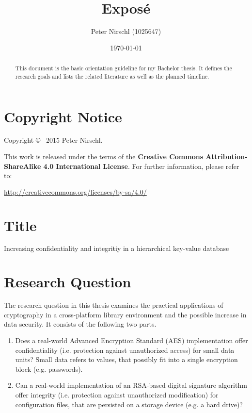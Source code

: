 \documentclass[a4paper]{article}
\title{Exposé}
\author{Peter Nirschl (1025647)}
\date{\today} %
\begin{document}
\maketitle
\begin{abstract}
This document is the basic orientation guideline for my Bachelor thesis.
It defines the research goals and lists the related literature as well as the planned timeline.
\end{abstract}
\setcounter{tocdepth}{1} %
\tableofcontents
\newpage

\section*{Copyright Notice}

Copyright \copyright~ 2015 Peter Nirschl.

This work is released under the terms of the \textbf{Creative Commons Attribution-ShareAlike 4.0 International License}.
For further information, please refer to:

\url{http://creativecommons.org/licenses/by-sa/4.0/}

\newpage

\section{Title}

Increasing confidentiality and integritiy in a hierarchical key-value database


\section{Research Question}

The research question in this thesis examines the practical applications of cryptography in a cross-platform library environment and the possible increase in data security.
It consists of the following two parts.

\begin{enumerate}
\item Does a real-world Advanced Encryption Standard (AES) implementation offer confidentiality (i.e. protection against unauthorized access) for small data units?
Small data refers to values, that possibly fit into a single encryption block (e.g. passwords).
      
\item Can a real-world implementation of an RSA-based digital signature algorithm offer integrity (i.e. protection against unauthorized modification) for configuration files, that are persisted on a storage device (e.g. a hard drive)?

\end{enumerate}
\end{document}
